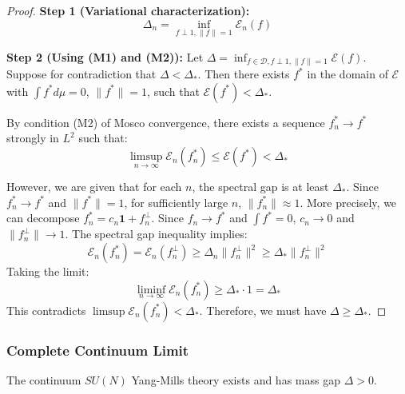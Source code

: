 \begin{proof}
\textbf{Step 1 (Variational characterization):}
\begin{equation}
\Delta_n = \inf_{f \perp 1, \|f\|=1} \mathcal{E}_n(f)
\end{equation}

\textbf{Step 2 (Using (M1) and (M2)):}
Let $\Delta = \inf_{f \in \mathcal{D}, f \perp 1, \|f\|=1} \mathcal{E}(f)$. Suppose for contradiction that $\Delta < \Delta_*$. 
Then there exists $f^*$ in the domain of $\mathcal{E}$ with $\int f^* d\mu = 0$, $\|f^*\| = 1$, such that $\mathcal{E}(f^*) < \Delta_*$.

By condition (M2) of Mosco convergence, there exists a sequence $f^*_n \to f^*$ strongly in $L^2$ such that:
\begin{equation}
\limsup_{n \to \infty} \mathcal{E}_n(f^*_n) \leq \mathcal{E}(f^*) < \Delta_*
\end{equation}

However, we are given that for each $n$, the spectral gap is at least $\Delta_*$. Since $f^*_n \to f^*$ and $\|f^*\| = 1$, for sufficiently large $n$, $\|f^*_n\| \approx 1$. 
More precisely, we can decompose $f^*_n = c_n \mathbf{1} + f_n^\perp$. Since $f_n \to f^*$ and $\int f^* = 0$, $c_n \to 0$ and $\|f_n^\perp\| \to 1$.
The spectral gap inequality implies:
\begin{equation}
\mathcal{E}_n(f^*_n) = \mathcal{E}_n(f_n^\perp) \geq \Delta_n \|f_n^\perp\|^2 \geq \Delta_* \|f_n^\perp\|^2
\end{equation}
Taking the limit:
\begin{equation}
\liminf_{n \to \infty} \mathcal{E}_n(f^*_n) \geq \Delta_* \cdot 1 = \Delta_*
\end{equation}
This contradicts $\limsup \mathcal{E}_n(f^*_n) < \Delta_*$.
Therefore, we must have $\Delta \geq \Delta_*$.
\end{proof}

\subsubsection{Complete Continuum Limit}

\begin{theorem}
\label{thm:continuum_existence_rigorous}
The continuum $SU(N)$ Yang-Mills theory exists and has mass gap $\Delta > 0$.
\end{theorem}

